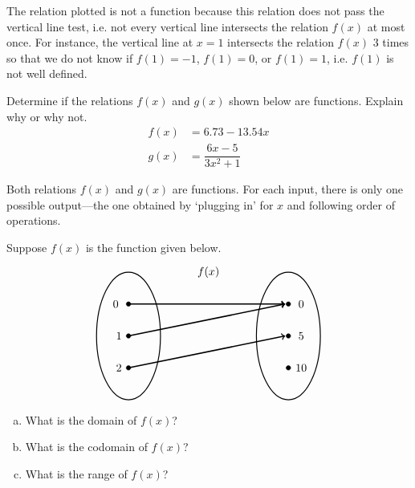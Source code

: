 \documentclass[11pt,letterpaper]{article}
\begin{document}
\sol The relation plotted is not a function because this relation does not pass the vertical line test, i.e. not every vertical line intersects the relation $f(x)$ at most once. For instance, the vertical line at $x= 1$ intersects the relation $f(x)$ 3 times so that we do not know if $f(1)= -1$, $f(1)= 0$, or $f(1)= 1$, i.e. $f(1)$ is not well defined. 



\newpage



 Determine if the relations $f(x)$ and $g(x)$ shown below are functions. Explain why or why not. 
	\[
	\begin{aligned}
	f(x)&= 6.73 - 13.54x \\[0.3cm]
	g(x)&= \dfrac{6x - 5}{3x^2 + 1}
	\end{aligned}
	\] \pspace

\sol Both relations $f(x)$ and $g(x)$ are functions. For each input, there is only one possible output---the one obtained by `plugging in' for $x$ and following order of operations. 



\newpage




 Suppose $f(x)$ is the function given below.
	\[
	\begin{tikzpicture}
	\node at (2.5,2) {$f(x)$};
	\draw[line width=0.03cm] (0,0) circle (1 and 2);
	\draw[line width=0.03cm] (5,0) circle (1 and 2);
	
	\draw[fill=black] (0,1) circle (0.07);
	\draw[fill=black] (0,0) circle (0.07);
	\draw[fill=black] (0,-1) circle (0.07);
	
	\draw[fill=black] (5,1) circle (0.07);
	\draw[fill=black] (5,0) circle (0.07);
	\draw[fill=black] (5,-1) circle (0.07);
	
	\draw[line width=0.04cm,->] (0,1) -- (4.9,1);
	\draw[line width=0.04cm,->] (0,0) -- (4.9,1);
	\draw[line width=0.04cm,->] (0,-1) -- (4.9,0);
	
	\node at (-0.4,1) {$0$};
	\node at (-0.3,0) {$1$};
	\node at (-0.3,-1) {$2$};
	
	\node at (5.4,1) {$0$};
	\node at (5.4,0) {$5$};
	\node at (5.4,-1) {$10$};
	\end{tikzpicture}
	\]

\begin{enumerate}[(a)]
\item What is the domain of $f(x)$?
\item What is the codomain of $f(x)$?
\item What is the range of $f(x)$?
\end{enumerate} \pspace
\end{document}
